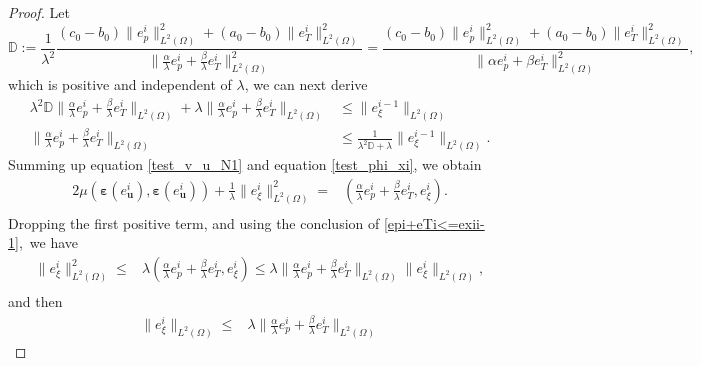 \documentclass{article}
\numberwithin{equation}{section}
\begin{document}
\begin{proof}
Let 
\begin{equation*} 
\mathbb{D}:=\frac{1}{\lambda^2}\frac{(c_0-b_0)\|e_{p}^i\|_{L^2(\Omega)}^2+(a_0-b_0)\|e_{T}^i\|_{L^2(\Omega)}^2}{ \|\frac\alpha\lambda e_{p}^i+\frac\beta\lambda e_{T}^i \|_{L^2(\Omega)}^2 } 
=\frac{(c_0-b_0)\|e_{p}^i\|_{L^2(\Omega)}^2+(a_0-b_0)\|e_{T}^i\|_{L^2(\Omega)}^2}{ \|\alpha e_{p}^i+\beta e_{T}^i \|_{L^2(\Omega)}^2 },
\end{equation*} 
which is positive and independent of $\lambda$, we can next derive  
\begin{equation}\label{epi+eTi<=exii-1}  
\begin{aligned}
   \lambda^2\mathbb{D}\|\frac\alpha\lambda e_{p}^i+\frac\beta\lambda e_{T}^i \|_{L^2(\Omega)}+\lambda\|\frac\alpha\lambda e_{p}^i+\frac\beta\lambda e_{T}^i \|_{L^2(\Omega)}  
& \le     \|e_{\xi}^{i-1}\|_{L^2(\Omega)} \\
\|\frac\alpha\lambda e_{p}^i+\frac\beta\lambda e_{T}^i \|_{L^2(\Omega)}& \le \frac1{\lambda^2\mathbb{D}+\lambda} \|e_{\xi}^{i-1}\|_{L^2(\Omega)}. 
\end{aligned}
\end{equation}  
Summing up equation \eqref{test_v_u_N1} and equation \eqref{test_phi_xi}, we obtain 
\begin{equation}  \label{eq:u+xi le xii-1}    
\begin{aligned}  
    2\mu (\bm\varepsilon(e_{\bm u}^i),\bm\varepsilon(e_{\bm u}^{i}))
     +\frac1\lambda\|e_\xi^i\|_{L^2(\Omega)}^2 
   =&   ( \frac\alpha\lambda e_{p}^i+\frac\beta\lambda e_{T}^i,e_{\xi}^{i})  .\\
\end{aligned}
\end{equation} 
Dropping the first positive term, and using the conclusion of \eqref{epi+eTi<=exii-1},~we have 
\begin{equation}      
\begin{aligned}  
      \|e_\xi^i\|_{L^2(\Omega)}^2 
   \le& \lambda( \frac\alpha\lambda e_{p}^i+\frac\beta\lambda e_{T}^i,e_{\xi}^{i})
   \le\lambda\|\frac\alpha\lambda e_{p}^i+\frac\beta\lambda e_{T}^i\|_{L^2(\Omega)}\|e_{\xi}^{i}\|_{L^2(\Omega)}
    ,\\ 
\end{aligned}
\end{equation} 
and then
\begin{equation}  \label{eq:exii le exii-1}    
\begin{aligned}   
  \|e_\xi^i\|_{L^2(\Omega)}  
   \le&\lambda \| \frac\alpha\lambda e_{p}^i+\frac\beta\lambda e_{T}^i\|_{L^2(\Omega)}

\end{aligned}
\end{equation}
\end{proof}
\end{document}

